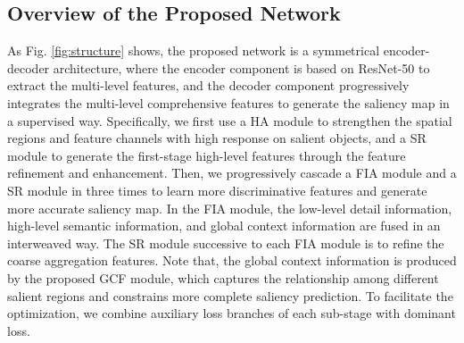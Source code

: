 \documentclass[letterpaper]{article} \usepackage{aaai20}  \usepackage{times}  \usepackage{helvet} \usepackage{courier}  \usepackage[hyphens]{url}  \usepackage{graphicx} \urlstyle{rm} \def\UrlFont{\rm}  \usepackage{graphicx}  \frenchspacing  \setlength{\pdfpagewidth}{8.5in}  \setlength{\pdfpageheight}{11in}
\begin{document}
\subsection{Overview of the Proposed Network}
As Fig. \ref{fig:structure} shows, the proposed network is a symmetrical encoder-decoder architecture, 
where the encoder component is based on ResNet-50 to extract the multi-level features, 
and the decoder component progressively integrates the multi-level comprehensive features to generate the saliency map in a supervised way.
Specifically, we first use a HA module to strengthen the spatial regions and feature channels with high response on salient objects, and a SR module to generate the first-stage high-level features through the feature refinement and enhancement.
Then, we progressively cascade a FIA module and a SR module in three times to learn more discriminative features and generate more accurate saliency map. In the FIA module, the low-level detail information, high-level semantic information, and global context information are fused in an interweaved way. The SR module successive to each FIA module is to refine the coarse aggregation features. Note that, the global context information is produced by the proposed GCF module, 
which captures the relationship among different salient regions and constrains more complete saliency prediction. 
To facilitate the optimization, we combine auxiliary loss branches of each sub-stage with dominant loss.
\end{document}
